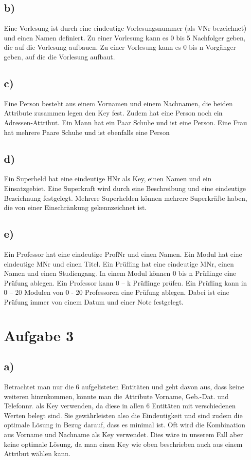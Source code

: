 \documentclass[12pt]{article}
\begin{document}
\subsection{b)}
Eine Vorlesung ist durch eine eindeutige Vorlesungsnummer (als VNr bezeichnet) und einen Namen definiert.
Zu einer Vorlesung kann es 0 bis 5 Nachfolger geben, die auf die Vorlesung aufbauen.
Zu einer Vorlesung kann es 0 bis n Vorgänger geben, auf die die Vorlesung aufbaut.

\subsection{c)}
Eine Person besteht aus einem Vornamen und einem Nachnamen, die beiden Attribute zusammen legen den Key fest. Zudem hat eine Person noch ein Adressen-Attribut.
Ein Mann hat ein Paar Schuhe und ist eine Person.
Eine Frau hat mehrere Paare Schuhe und ist ebenfalls eine Person

\subsection{d)}
Ein Superheld hat eine eindeutige HNr als Key, einen Namen und ein Einsatzgebiet.
Eine Superkraft wird durch eine Beschreibung und eine eindeutige Bezeichnung festgelegt.
Mehrere Superhelden können mehrere Superkräfte haben, die von einer Einschränkung gekennzeichnet ist.

\subsection{e)}
Ein Professor hat eine eindeutige ProfNr und einen Namen.
Ein Modul hat eine eindeutige MNr und einen Titel.
Ein Prüfling hat eine eindeutige MNr, einen Namen und einen Studiengang.
In einem Modul können 0 bis n Prüflinge eine Prüfung ablegen. Ein Professor kann 0 – k Prüflinge prüfen. Ein Prüfling kann in 0 – 20 Modulen von 0 - 20 Professoren eine Prüfung ablegen. Dabei ist eine Prüfung immer von einem Datum und einer Note festgelegt.

\section{Aufgabe 3}
\subsection{a)}
Betrachtet man nur die 6 aufgelisteten Entitäten und geht davon aus, dass keine weiteren hinzukommen, könnte man die Attribute Vorname, Geb.-Dat. und Telefonnr. als Key verwenden, da diese in allen 6 Entitäten mit verschiedenen Werten belegt sind. Sie gewährleisten also die Eindeutigkeit und sind zudem die optimale Lösung in Bezug darauf, dass es minimal ist. Oft wird die Kombination aus Vorname und Nachname als Key verwendet. Dies wäre in unserem Fall aber keine optimale Lösung, da man einen Key wie oben beschrieben auch aus einem Attribut wählen kann.
\end{document}
